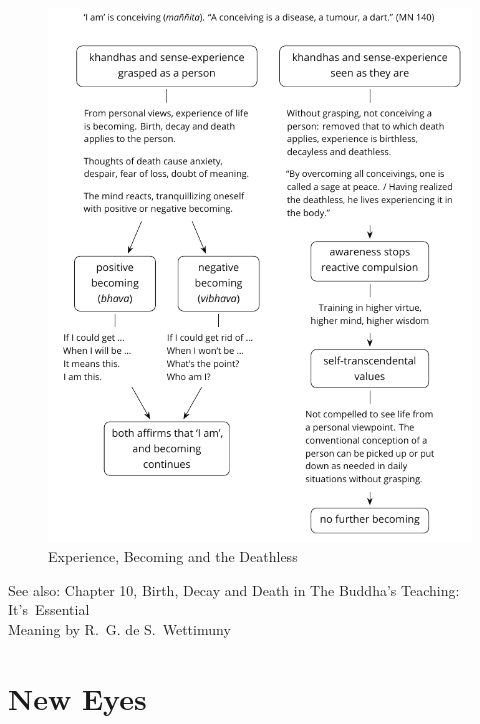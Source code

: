 \begin{figure}[h]
\caption{Experience, Becoming and the Deathless}\label{fig-experience-becoming-deathless}
\bigskip
\includegraphics[width=\linewidth-2mm]{./manuscript/tex/diagrams/experience-becoming-deathless.pdf}

\end{figure}

\bigskip

{\noindent\footnotesize
See also: Chapter 10, Birth, Decay and Death in The Buddha's Teaching: It's~Essential\\
Meaning by R.~G. de S.~Wettimuny
\par}

\clearpage
\normalpagelayout

\section{New Eyes}


